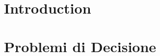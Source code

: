 \providecommand{\main}{.}








{\hypersetup{hidelinks}
	\tableofcontents  %
}

\chapter{Introduction}


\chapter{Problemi di Decisione}


%

\appendix
%



